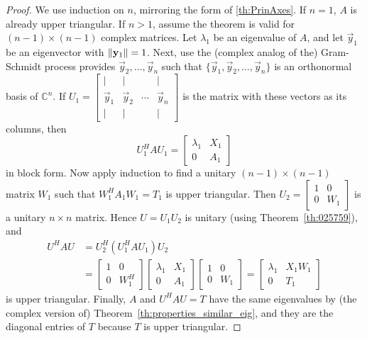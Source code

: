 \documentclass{ximera}
\begin{document}
\begin{proof}
We use induction on $n$, mirroring the form of \ref{th:PrinAxes}. If $n = 1$, $A$ is already upper triangular. If $n > 1$, assume the theorem is valid for $(n - 1) \times (n - 1)$ complex matrices. Let $\lambda_{1}$ be an eigenvalue of $A$, and let $\vec{y}_{1}$ be an eigenvector with $\left\lVert\mathbf{y}_{1}\right\rVert = 1$. Next, use the (complex analog of the) Gram-Schmidt process provides $\vec{y}_{2}, \ldots, \vec{y}_{n}$ such that $\{\vec{y}_{1}, \vec{y}_{2}, \ldots, \vec{y}_{n}\}$ is an orthonormal basis of $\mathbb{C}^n$. If $U_{1} = \left[ \begin{array}{cccc}
| & | & & | \\
\vec{y}_{1} & \vec{y}_{2} & \cdots & \vec{y}_{n} \\
| & | & & |
\end{array}\right]$ is the matrix with these vectors as its columns, then
\begin{equation*}
U_{1}^HAU_{1} = \left[ \begin{array}{cc}
\lambda_{1} & X_{1} \\
0 & A_{1}
\end{array}\right]
\end{equation*}
in block form. Now apply induction to find a unitary $(n - 1) \times (n - 1)$ matrix $W_{1}$ such that $W_{1}^HA_{1}W_{1} = T_{1}$
 is upper triangular. Then $U_{2} = \left[ \begin{array}{cc}
 1 & 0 \\
 0 & W_{1}
 \end{array}\right]$
 is a unitary $n \times n$ matrix. Hence $U = U_{1}U_{2}$ is unitary (using Theorem~\ref{th:025759}), and
\begin{align*}
U^HAU &= U_{2}^H(U_{1}^HAU_{1})U_{2} \\
	   &= \left[ \begin{array}{cc}
	   1 & 0 \\
	   0 & W_{1}^H
	   \end{array}\right] \left[ \begin{array}{cc}
   	   \lambda_{1} & X_{1} \\
	   0 & A_{1}
	   \end{array}\right] \left[ \begin{array}{cc}
	   1 & 0 \\
	   0 & W_{1}
	   \end{array}\right] = \left[ \begin{array}{cc}
	   \lambda_{1} & X_{1}W_{1} \\
	   0 & T_{1}
	   \end{array}\right]
\end{align*}
is upper triangular. Finally, $A$ and $U^{H}AU = T$ have the same eigenvalues by (the complex version of) Theorem~\ref{th:properties_similar_eig}, and they are the diagonal entries of $T$ because $T$ is upper triangular.
\end{proof}
\end{document}

